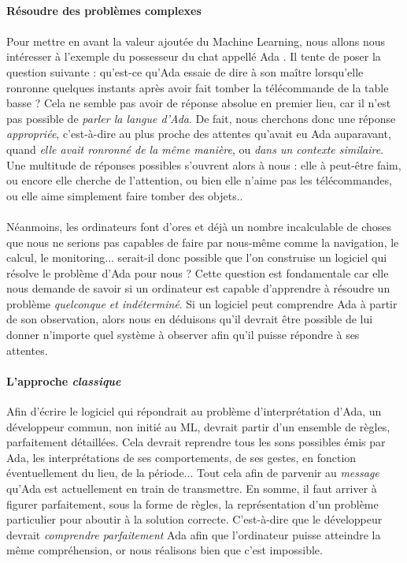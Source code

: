 \paragraph{Résoudre des problèmes complexes}

\paragraph{} Pour mettre en avant la valeur ajoutée du Machine Learning, nous allons nous intéresser à l'exemple
du possesseur du chat appellé Ada \cite{MachineLearning0}. Il tente de poser la question suivante : qu'est-ce qu'Ada essaie de dire
à son maître lorsqu'elle ronronne quelques instants après avoir fait tomber la télécommande de la table basse ? Cela ne semble
pas avoir de réponse absolue en premier lieu, car il n'est pas possible de \emph{parler la langue d'Ada}. De fait, nous cherchons
donc une réponse \emph{appropriée}, c'est-à-dire au plus proche des attentes qu'avait eu
Ada auparavant, quand \emph{elle avait ronronné de la même manière}, ou \emph{dans un contexte similaire}. Une multitude de réponses
possibles s'ouvrent alors à nous : elle à peut-être faim, ou encore elle cherche de l'attention, ou bien elle n'aime pas les
télécommandes, ou elle aime simplement faire tomber des objets.. 

\paragraph{} Néanmoins, les ordinateurs font d'ores et déjà un nombre incalculable de choses que nous ne serions pas capables de faire
par nous-même comme la navigation, le calcul, le monitoring... serait-il donc possible que l'on construise un logiciel qui résolve le problème
d'Ada pour nous ? Cette question est fondamentale car elle nous demande de savoir si un ordinateur est capable d'apprendre à résoudre un
problème \emph{quelconque et indéterminé}. Si un logiciel peut comprendre Ada à partir de son observation, alors nous en déduisons qu'il devrait
être possible de lui donner n'importe quel système à observer afin qu'il puisse répondre à ses attentes.   

\paragraph{L'approche \emph{classique}} Afin d'écrire le logiciel qui répondrait au problème d'interprétation d'Ada, un développeur commun,
non initié au ML, devrait partir d'un ensemble de règles, parfaitement détaillées. Cela devrait reprendre tous les sons possibles émis par Ada,
les interprétations de ses comportements, de ses gestes, en fonction éventuellement du lieu, de la période... Tout cela afin de parvenir au 
\emph{message} qu'Ada est actuellement en train de transmettre. En somme, il faut arriver à figurer parfaitement, sous la forme de règles,
la représentation d'un problème particulier pour aboutir à la solution correcte. C'est-à-dire que le développeur devrait \emph{comprendre parfaitement}
Ada afin que l'ordinateur puisse atteindre la même compréhension, or nous réalisons bien que c'est impossible.

